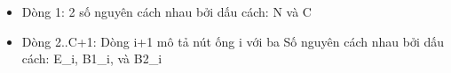 \begin{itemize}
	\item     Dòng 1: 2 số nguyên cách nhau bởi dấu cách: N và C   
	\item     Dòng 2..C+1: Dòng i+1 mô tả nút ống i với ba         Số nguyên cách nhau bởi dấu cách: E\_i, B1\_i, và B2\_i   
\end{itemize}